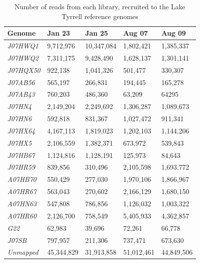 \begin{table}[ht!]
  \caption{Number of reads from each library, recruited to the Lake Tyrrell reference genomes}
  \begin{tabularx}{\textwidth}{L{2.2cm}R{2cm}R{3cm}R{3.2cm}R{2cm}}
  \hline
    \textbf{Genome} & \textbf{Jan 23} & \textbf{Jan 25} & \textbf{Aug 07} & \textbf{Aug 09} \\
    \hline
     \textit{J07HWQ1} & 9,712,976 & 10,347,084 & 1,802,421 & 1,385,337 \\
     \textit{J07HWQ2} & 7,311,175 & 9,428,490 & 1,628,137 & 1,301,141 \\
     \textit{J07HQX50} & 922,138 & 1,041,326 & 501,477 & 330,307 \\
     \textit{J07AB56} & 565,197 & 266,831 & 194,445 & 165,278 \\
     \textit{J07AB43} & 760,203 & 486,360 & 63,209 & 64295 \\
     \textit{J07HN4} & 2,149,204 & 2,249,692 & 1,306,287 & 1,089,673 \\
     \textit{J07HN6} & 592,818 & 831,367 & 1,027,472 & 911,341 \\
     \textit{J07HX64} & 4,167,113 & 1,819,023 & 1,202,103 & 1,144,206 \\
     \textit{J07HX5} & 2,106,559 & 1,382,371 & 673,972 & 539,843 \\
     \textit{J07HB67} & 1,124,816 & 1,128,191 & 125,973 & 84,643 \\
     \textit{J07HR59} & 839,856 & 310,496 & 2,105,598 & 1,693,772 \\
     \textit{A07HB70} & 550,429 & 277,030 & 1,970,106 & 1,866,967 \\
     \textit{A07HR67} & 563,043 & 270,602 & 2,166,129 & 1,680,150 \\
     \textit{A07HN63} & 547,808 & 786,856 & 1,126,032 & 1,003,322 \\
     \textit{A07HR60} & 2,126,700 & 758,549 & 5,405,933 & 4,362,857 \\
     \textit{G22} & 62,983 & 39,696 & 72,261 & 66,778 \\
     \textit{J07SB} & 797,957 & 211,306 & 737,471 & 673,630 \\     
  \textit{Unmapped} & 45,344,829 & 31,913,858 & 51,012,461 & 44,849,506 \\
  \end{tabularx}
  \label{ReadRecruitmentGenome}
\end{table}


